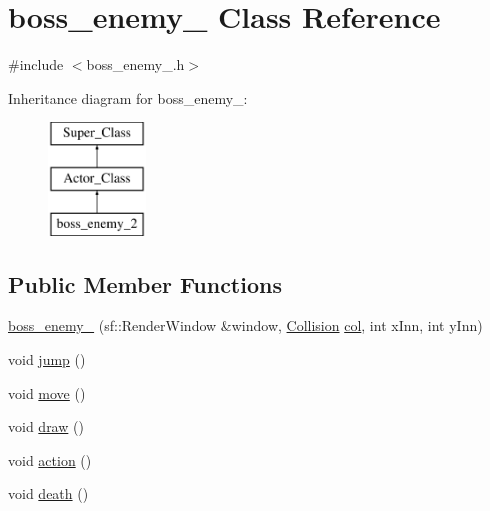 \hypertarget{classboss__enemy__2}{}\section{boss\+\_\+enemy\+\_ Class Reference}
\label{classboss__enemy__2}


{\ttfamily \#include $<$boss\+\_\+enemy\+\_.\+h$>$}

Inheritance diagram for boss\+\_\+enemy\+\_\+:\begin{figure}[H]
\begin{center}
\leavevmode
\includegraphics[height=3.000000cm]{classboss__enemy__2}
\end{center}
\end{figure}
\subsection*{Public Member Functions}
\begin{DoxyCompactItemize}
\item 
\hyperlink{classboss__enemy__2_a5090ddbdea5fedbd070705079b053c14}{boss\+\_\+enemy\+\_} (sf\+::\+Render\+Window \&window, \hyperlink{class_collision}{Collision} \hyperlink{classboss__enemy__2_a59f86459a90bbd1ad535889e9197cb6f}{col}, int x\+Inn, int y\+Inn)
\item 
void \hyperlink{classboss__enemy__2_a7edccc066047aacf21797b6d4316f57c}{jump} ()
\item 
void \hyperlink{classboss__enemy__2_a8d81c7498b4a31d735bd4af21ce81d84}{move} ()
\item 
void \hyperlink{classboss__enemy__2_aea8e734cf65b63f1d8ba143f3b449f63}{draw} ()
\item 
void \hyperlink{classboss__enemy__2_a6315561045c1530e588014caaf6a9292}{action} ()
\item 
void \hyperlink{classboss__enemy__2_a602bdac1d534a3d37e9cd76616216b45}{death} ()
\end{DoxyCompactItemize}
